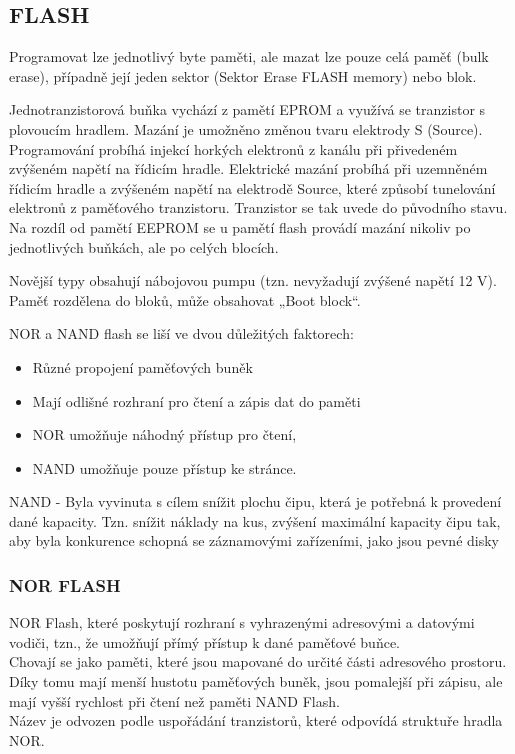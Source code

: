 \subsection{FLASH}
Programovat lze jednotlivý byte paměti, ale mazat lze pouze celá paměť (bulk erase), případně její jeden sektor (Sektor Erase FLASH memory) nebo blok.

Jednotranzistorová buňka vychází z pamětí EPROM a využívá se tranzistor s plovoucím hradlem.
Mazání je umožněno změnou tvaru elektrody S (Source). Programování probíhá injekcí horkých elektronů z kanálu při přivedeném zvýšeném napětí na řídicím hradle. Elektrické mazání probíhá při uzemněném řídicím hradle a zvýšeném napětí na elektrodě Source, které způsobí tunelování elektronů z paměťového tranzistoru. Tranzistor se tak uvede do původního stavu. Na rozdíl od pamětí EEPROM se u pamětí flash provádí mazání nikoliv po jednotlivých buňkách, ale po celých blocích.

Novější typy obsahují nábojovou pumpu (tzn. nevyžadují zvýšené napětí 12 V). Paměť rozdělena do bloků, může obsahovat „Boot block“.

NOR a NAND flash se liší ve dvou důležitých
faktorech:
\begin{itemize}
\item Různé propojení paměťových buněk
\item Mají odlišné rozhraní pro čtení a zápis dat do paměti
\item NOR umožňuje náhodný přístup pro čtení,
\item NAND umožňuje pouze přístup ke stránce.
\end{itemize}
NAND - Byla vyvinuta s cílem snížit plochu čipu, která je potřebná k provedení dané kapacity.
Tzn. snížit náklady na kus, zvýšení maximální kapacity čipu tak, aby byla konkurence schopná se
záznamovými zařízeními, jako jsou pevné disky
\subsubsection{NOR FLASH}
NOR Flash, které poskytují rozhraní s vyhrazenými adresovými a datovými vodiči, tzn., že umožňují přímý přístup k dané paměťové buňce.\\
Chovají se jako paměti, které jsou mapované do určité části adresového prostoru. Díky tomu mají menší hustotu paměťových buněk, jsou pomalejší při zápisu,
ale mají vyšší rychlost při čtení než paměti NAND Flash.\\
Název je odvozen podle uspořádání tranzistorů, které
odpovídá struktuře hradla NOR.

